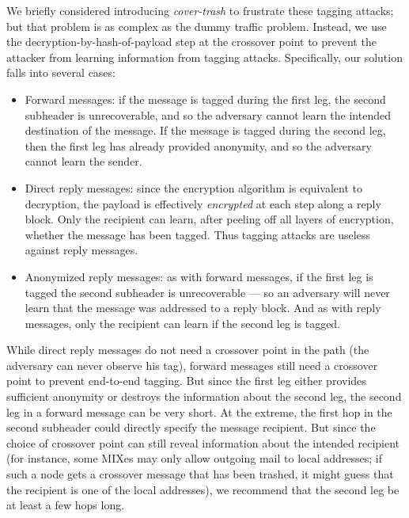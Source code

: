 \documentclass{llncs}
\begin{document}
We briefly considered introducing \emph{cover-trash} to frustrate
these tagging attacks; but that problem is as complex as the dummy
traffic problem. Instead, we use the decryption-by-hash-of-payload step at the
crossover point to prevent the attacker from learning information from
tagging attacks.  Specifically, our solution falls into several cases:

\begin{itemize}
\item Forward messages: if the message is tagged during the first leg,
the second subheader is unrecoverable, and so the adversary cannot
learn the intended destination of the message. If the message is tagged
during the second leg, then the first leg has already provided anonymity,
and so the adversary cannot learn the sender.
\item Direct reply messages: since the encryption algorithm is equivalent to
decryption, the payload is effectively \emph{encrypted} at each step
along a reply block. Only the recipient can learn, after peeling off
all layers of encryption, whether the message has been tagged. Thus
tagging attacks are useless against reply messages.
\item Anonymized reply messages: as with forward messages, if the first leg
is tagged the second subheader is unrecoverable --- so an adversary will
never learn that the message was addressed to a reply block. And as with
reply messages, only the recipient can learn if the second leg is tagged.
\end{itemize}

While direct reply messages do not need a crossover point in the path
(the adversary can never observe his tag), forward messages still need a
crossover point to prevent end-to-end tagging. But since the first leg
either provides sufficient anonymity or destroys the information about
the second leg, the second leg in a forward message can be very short.
At the extreme, the first hop in the second subheader could directly
specify the message recipient. But since the choice of crossover point
can still reveal information about the intended recipient (for instance,
some MIXes may only allow outgoing mail to local addresses; if such a
node gets a crossover message that has been trashed, it might guess
that the recipient is one of the local addresses), we recommend that
the second leg be at least a few hops long.
\end{document}
